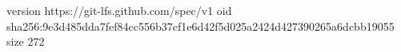 version https://git-lfs.github.com/spec/v1
oid sha256:9e3d485dda7fef84cc556b37cf1e6d42f5d025a2424d427390265a6dcbb19055
size 272
